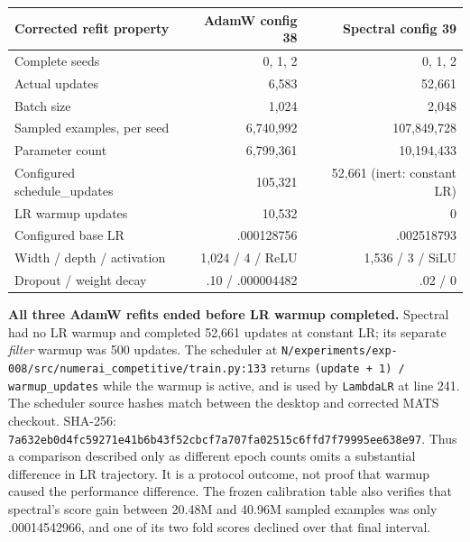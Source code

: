 \documentclass[
  british,
  10pt,
  a4paper,
]{article}
\newcounter{none} %
\begin{document}
{\def\LTcaptype{none} %
\begin{longtable}[]{@{}lrr@{}}
\toprule\noalign{}
Corrected refit property & AdamW config 38 & Spectral config 39 \\
\midrule\noalign{}
\endhead
\bottomrule\noalign{}
\endlastfoot
Complete seeds & 0, 1, 2 & 0, 1, 2 \\
Actual updates & 6,583 & 52,661 \\
Batch size & 1,024 & 2,048 \\
Sampled examples, per seed & 6,740,992 &
107,\allowbreak{}849,\allowbreak{}728 \\
Parameter count & 6,799,361 & 10,194,433 \\
Configured schedule\_updates & 105,321 & 52,661 (inert: constant LR) \\
LR warmup updates & 10,532 & 0 \\
Configured base LR & .000128756 & .002518793 \\
Width / depth / activation & 1,024 / 4 / ReLU & 1,536 / 3 / SiLU \\
Dropout / weight decay & .10 / .000004482 & .02 / 0 \\
\end{longtable}
}

\textbf{All three AdamW refits ended before LR warmup completed.}
Spectral had no LR warmup and completed 52,661 updates at constant LR;
its separate \emph{filter} warmup was 500 updates. The scheduler at
\texttt{N/\allowbreak{}experiments/\allowbreak{}exp-\allowbreak{}008/\allowbreak{}src/\allowbreak{}numerai\_\allowbreak{}competitive/\allowbreak{}train.\allowbreak{}py:\allowbreak{}133}
returns
\texttt{(update \allowbreak{}+ \allowbreak{}1) \allowbreak{}/\allowbreak{} \allowbreak{}warmup\_\allowbreak{}updates}
while the warmup is active, and is used by \texttt{LambdaLR} at line
241. The scheduler source hashes match between the desktop and corrected
MATS checkout. SHA-256:
\texttt{7a632eb0d4fc\allowbreak{}59271e41b6b4\allowbreak{}3f52cbcf7a70\allowbreak{}7fa02515c6ff\allowbreak{}d7f79995ee63\allowbreak{}8e97}.
Thus a comparison described only as different epoch counts omits a
substantial difference in LR trajectory.\allowbreak{} It is a protocol
outcome, not proof that warmup caused the performance
difference.\allowbreak{} The frozen calibration table also verifies that
spectral's score gain between 20.48M and 40.96M sampled examples was
only .\allowbreak{}00014542966,\allowbreak{} and one of its two fold
scores declined over that final interval.
\end{document}
